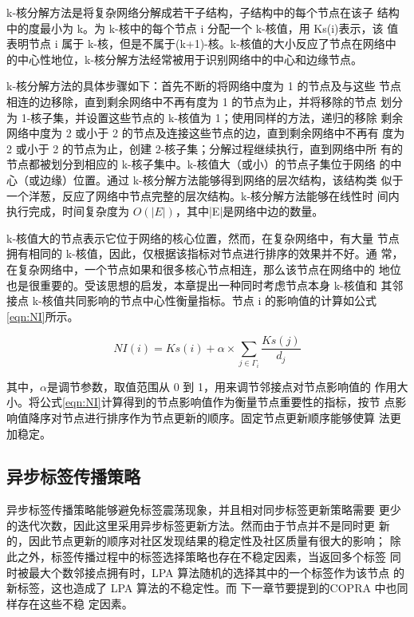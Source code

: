 k-核分解方法是将复杂网络分解成若干子结构，子结构中的每个节点在该子
结构中的度最小为 k。为 k-核中的每个节点 i 分配一个 k-核值，用 Ks(i)表示，该
值表明节点 i 属于 k-核，但是不属于(k+1)-核。k-核值的大小反应了节点在网络中
的中心性地位，k-核分解方法经常被用于识别网络中的中心和边缘节点。

k-核分解方法的具体步骤如下：首先不断的将网络中度为 1 的节点及与这些
节点相连的边移除，直到剩余网络中不再有度为 1 的节点为止，并将移除的节点
划分为 1-核子集，并设置这些节点的 k-核值为 1；使用同样的方法，递归的移除
剩余网络中度为 2 或小于 2 的节点及连接这些节点的边，直到剩余网络中不再有
度为 2 或小于 2 的节点为止，创建 2-核子集；分解过程继续执行，直到网络中所
有的节点都被划分到相应的 k-核子集中。k-核值大（或小）的节点子集位于网络
的中心（或边缘）位置。通过 k-核分解方法能够得到网络的层次结构，该结构类
似于一个洋葱，反应了网络中节点完整的层次结构。k-核分解方法能够在线性时
间内执行完成，时间复杂度为 $O(|E|)$，其中|E|是网络中边的数量。

k-核值大的节点表示它位于网络的核心位置，然而，在复杂网络中，有大量
节点拥有相同的 k-核值，因此，仅根据该指标对节点进行排序的效果并不好。通
常，在复杂网络中，一个节点如果和很多核心节点相连，那么该节点在网络中的
地位也是很重要的。受该思想的启发，本章提出一种同时考虑节点本身 k-核值和
其邻接点 k-核值共同影响的节点中心性衡量指标。节点 i 的影响值的计算如公式\ref{eqn:NI}所示。

\begin{equation}
  \label{eqn:NI}
  NI(i)=Ks(i)+\alpha \times \sum_{j \in \Gamma _i} \frac{Ks(j)}{d_j}
\end{equation}

其中，$\alpha$是调节参数，取值范围从 0 到 1，用来调节邻接点对节点影响值的
作用大小。将公式\ref{eqn:NI}计算得到的节点影响值作为衡量节点重要性的指标，按节
点影响值降序对节点进行排序作为节点更新的顺序。固定节点更新顺序能够使算
法更加稳定。 

\subsection{异步标签传播策略}

异步标签传播策略能够避免标签震荡现象，并且相对同步标签更新策略需要
更少的迭代次数，因此这里采用异步标签更新方法。然而由于节点并不是同时更
新的，因此节点更新的顺序对社区发现结果的稳定性及社区质量有很大的影响；
除此之外，标签传播过程中的标签选择策略也存在不稳定因素，当返回多个标签
同时被最大个数邻接点拥有时，LPA 算法随机的选择其中的一个标签作为该节点
的新标签，这也造成了 LPA 算法的不稳定性。而 下一章节要提到的COPRA 中也同样存在这些不稳
定因素。

